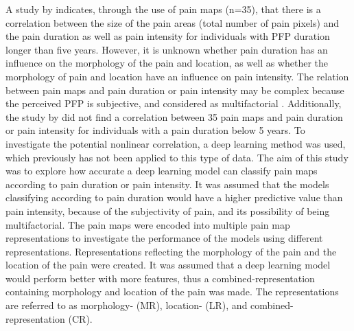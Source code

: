 \noindent
A study by \citeauthor{Boudreau2017} \citep{Boudreau2017} indicates, through the use of pain maps (n=35), that there is a correlation between the size of the pain areas (total number of pain pixels) and the pain duration as well as pain intensity for individuals with PFP duration longer than five years.\citep{Boudreau2017}
However, it is unknown whether pain duration has an influence on the morphology of the pain and location, as well as whether the morphology of pain and location have an influence on pain intensity.
The relation between pain maps and pain duration or pain intensity may be complex because the perceived PFP is subjective, and considered as multifactorial \citep{Dansie2013}. Additionally, the study by \citeauthor{Boudreau2017} \citep{Boudreau2017} did not find a correlation between 35 pain maps and pain duration or pain intensity for individuals with a pain duration below 5 years. To investigate the potential nonlinear correlation, a deep learning method was used, which previously has not been applied to this type of data. \newline
\noindent
The aim of this study was to explore how accurate a deep learning model can classify pain maps according to pain duration or pain intensity. It was assumed that the models classifying according to pain duration would have a higher predictive value than pain intensity, because of the subjectivity of pain, and its possibility of being multifactorial. The pain maps were encoded into multiple pain map representations to investigate the performance of the models using different representations. Representations reflecting the morphology of the pain and the location of the pain were created. It was assumed that a deep learning model would perform better with more features, thus a combined-representation containing morphology and location of the pain was made. The representations are referred to as morphology- (MR), location- (LR), and combined-representation (CR).
